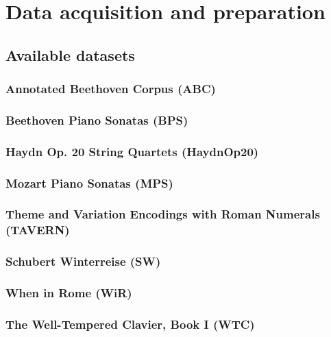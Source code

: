 \chapter{Data acquisition and preparation}
\label{chap:chap3}


\section{Available datasets}

\subsection{Annotated Beethoven Corpus (ABC)}
\subsection{Beethoven Piano Sonatas (BPS)}
\subsection{Haydn Op. 20 String Quartets (HaydnOp20)}
\subsection{Mozart Piano Sonatas (MPS)}
\subsection{Theme and Variation Encodings with Roman Numerals (TAVERN)}
\subsection{Schubert Winterreise (SW)}
\subsection{When in Rome (WiR)}
\subsection{The Well-Tempered Clavier, Book I (WTC)}


